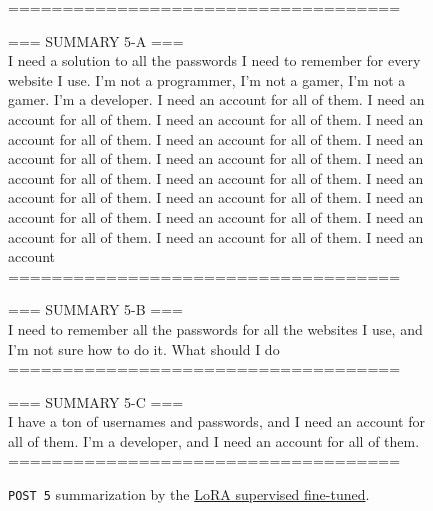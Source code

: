 \documentclass{article}
\begin{document}
\begin{figure*}[h!]
    \centering
    \begin{tcolorbox}[colframe=black!10!white, colback=black!5!white]
        \begin{minipage}{\textwidth}
            \ttfamily
            ====================================

            === SUMMARY 5-A ===\\
             I need a solution to all the passwords I need to remember for every website I use. I'm not a programmer, I'm not a gamer, I'm not a gamer. I'm a developer. I need an account for all of them. I need an account for all of them. I need an account for all of them. I need an account for all of them. I need an account for all of them. I need an account for all of them. I need an account for all of them. I need an account for all of them. I need an account for all of them. I need an account for all of them. I need an account for all of them. I need an account for all of them. I need an account for all of them. I need an account for all of them. I need an account for all of them. I need an account\\
            
            ====================================
            
            === SUMMARY 5-B ===\\
             I need to remember all the passwords for all the websites I use, and I'm not sure how to do it. What should I do \\                                                                                                                                                       
            
            ====================================
            
            === SUMMARY 5-C ===\\
             I have a ton of usernames and passwords, and I need an account for all of them. I'm a developer, and I need an account for all of them. \\
            ====================================       
        \end{minipage}
    \end{tcolorbox}
    \caption{\texttt{POST 5} summarization by the \href{https://huggingface.co/course-genai-w24/week4-gpt2-lora-sft-tldr}{LoRA supervised fine-tuned}.}
    \label{I7:lora-gpt-2-example}
\end{figure*}
\end{document}

